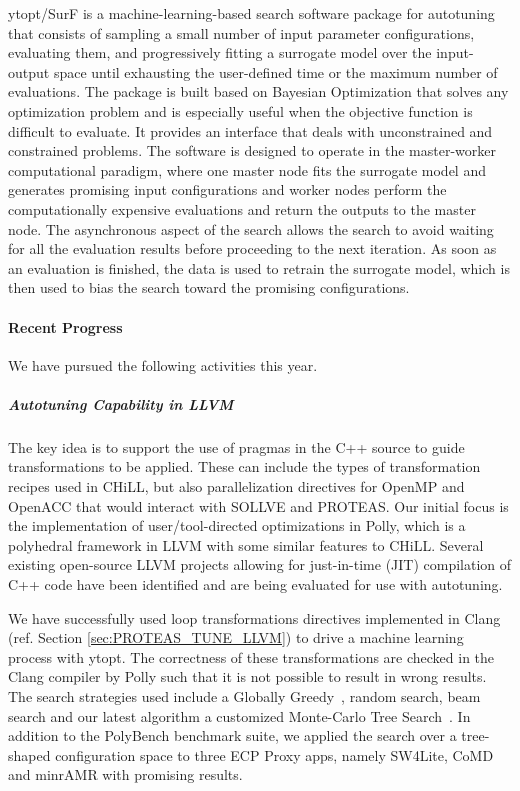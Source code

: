 ytopt/SurF is a machine-learning-based search software package for autotuning that consists of sampling a small number of input parameter configurations, evaluating them, and progressively fitting a surrogate model over the input-output space until exhausting the user-defined time or the maximum number of evaluations. The package is built based on Bayesian Optimization that solves any optimization problem and is especially useful when the objective function is difficult to evaluate. It provides an interface that deals with unconstrained and constrained problems. The software is designed to operate in the master-worker computational paradigm, where one master node fits the surrogate model and generates promising input configurations and worker nodes perform the computationally expensive evaluations and return the outputs to the master node. The asynchronous aspect of the search allows the search to avoid waiting for all the evaluation results before proceeding to the next iteration. As soon as an evaluation is finished, the data is used to retrain the surrogate model, which is then used to bias the search toward the promising configurations.


\paragraph{Recent Progress}


We have pursued the following activities this year.

\subparagraph{Autotuning Capability in LLVM}

The key idea is to support the use of pragmas in the C++ source to guide transformations to be applied. These can include the types of transformation recipes used in CHiLL, but also parallelization directives for OpenMP and OpenACC that would interact with SOLLVE and PROTEAS. Our initial focus is the implementation of user/tool-directed optimizations in Polly, which is a polyhedral framework in LLVM with some similar features to CHiLL. Several existing open-source LLVM projects allowing for just-in-time (JIT) compilation of C++ code have been identified and are being evaluated for use with autotuning. 

We have successfully used loop transformations directives implemented in Clang (ref. Section \ref{sec:PROTEAS_TUNE_LLVM}) to drive a machine learning process with ytopt. The correctness of these transformations are checked in the Clang compiler by Polly such that it is not possible to result in wrong results. The search strategies used include a Globally Greedy~\cite{kruse2020search}, random search, beam search and our latest algorithm a customized Monte-Carlo Tree Search~\cite{wu2021autotuning}.
In addition to the PolyBench benchmark suite, we applied the search over a tree-shaped configuration space to three ECP Proxy apps, namely SW4Lite, CoMD and minrAMR with promising results.


